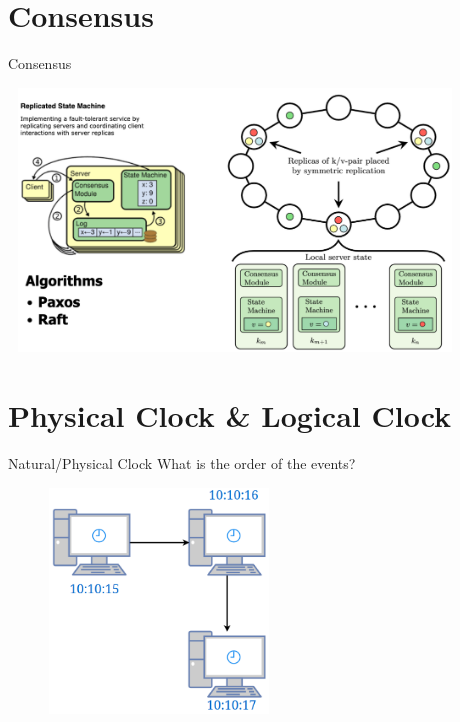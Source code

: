 \documentclass{beamer}
\begin{document}
\section{Consensus}
\begin{frame}{Consensus}
		\begin{center}
   	 		\includegraphics[width=0.9\textwidth, height=70mm, scale=1]{img/consensus.PNG}
  		\end{center}
\end{frame}

\section{Physical Clock \& Logical Clock}
\begin{frame}{Natural/Physical Clock}
\color{red} {What is the order of the events?}
		\begin{center}
   	 		\includegraphics[width=0.6\textwidth, height=60mm, scale=1]{img/ds-clocks.png}
  		\end{center}
\end{frame}
\end{document}
